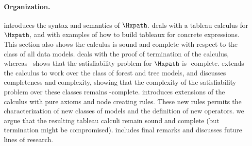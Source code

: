 
\paragraph{Organization.}  
 introduces the syntax
and semantics of $\Hxpath$.   deals with a tableau calculus for
$\Hxpath$, and with examples of how to build tableaux for concrete expressions. This section also shows the calculus is sound and complete with respect to the class of all data models.
 deals with the proof of termination of the calculus, whereas~ shows that the satisfiability problem for $\Hxpath$ is \pspace-complete.
 extends the calculus to work
over the class of forest and tree models, and discusses completeness and complexity, showing that the complexity of the satisfiability problem over these classes remains \pspace-complete. 
 introduces extensions of the calculus with pure axioms and node creating rules. These new rules permits the characterization of new classes of models and the definition of new operators. we argue that the resulting tableau calculi remain sound and complete (but termination might be compromised).  includes final remarks and discusses future lines of research.



